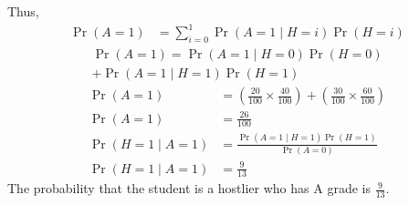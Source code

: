 \documentclass[12pt,twocolumn]{article}
\providecommand{\pr}[1]{\ensuremath{\Pr\left(#1\right)}}
\begin{document}
Thus,
\begin{align}
	\pr{A=1} &= \sum_{i=0}^1 \pr{A = 1 \mid H = i}\pr{H=i}
\end{align}
\begin{multline}
	\pr{A=1} = \pr{A = 1 \mid H = 0}\pr{H = 0}\\
	+\pr{A = 1 \mid H = 1}\pr{H = 1}
\end{multline}
\begin{align}
	\pr{A=1} &= \left(\frac{20}{100} \times \frac{40}{100}\right)+\left(\frac{30}{100} \times \frac{60}{100}\right)\\
	\pr{A=1} &= \frac{26}{100}\\
	\pr{H=1 \mid A=1} &= \frac{\pr{A=1 \mid H=1}\pr{H=1}}{\pr{A=0}}\\
	\pr{H=1 \mid A=1} &= \frac{9}{13}
\end{align}
The probability that the student is a hostlier who has A grade is $\frac{9}{13}$.
\end{document}
